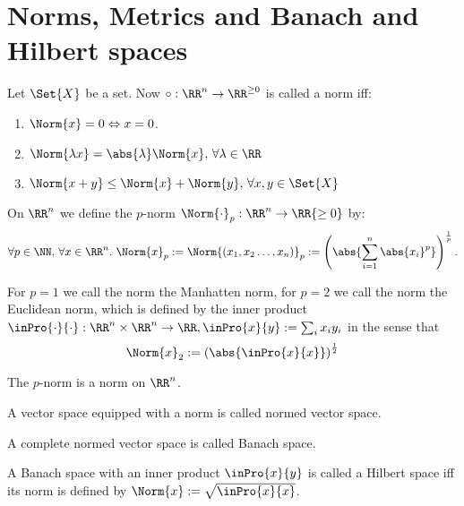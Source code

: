 \section{Norms, Metrics and Banach and Hilbert spaces}
\begin{defn}
 Let $\Set{X}$ be a set. Now $\circ:\RR^n\to\RR^{\geq 0}$ is called a norm iff:
 \begin{enumerate}
  \item $\Norm{x}=0\Leftrightarrow x=0$.
  \item $\Norm{\lambda x}=\abs{\lambda}\Norm{x}, \,\forall \lambda\in\RR$
  \item $\Norm{x+y}\leq\Norm{x}+\Norm{y}, \,\forall x,y\in\Set{X}$
 \end{enumerate}
\end{defn}
\begin{defn}
 On $\RR^n$ we define the $p$-norm $\Norm{\cdot}_p:\RR^n\to\RR{\geq 0}$ by:
 $$\forall p\in\NN,\, \forall x\in\RR^n.\ \Norm{x}_p:=\Norm{(x_1, x_2\ldots, x_n)}_p:=\left(\abs{\sum_{i=1}^{n}\abs{x_i}^p}\right)^{\frac{1}{p}}.$$
\end{defn}
For $p=1$ we call the norm the Manhatten norm, for $p=2$ we call the norm the Euclidean norm, which is defined by the inner product $\inPro{\cdot}{\cdot}:\RR^n\times \RR^n\to\RR, \inPro{x}{y}:=\sum_{i}x_iy_i$ in the sense that $$\Norm{x}_2:=\left(\abs{\inPro{x}{x}}\right)^\frac{1}{2}$$
\begin{exc}
 The $p$-norm is a norm on $\RR^n$. 
\end{exc}
\begin{defn}
 A vector space equipped with a norm is called normed vector space.
\end{defn}
\begin{defn}
 A complete normed vector space is called Banach space.
\end{defn}
\begin{defn}
 A Banach space with an inner product $\inPro{x}{y}$ is called a Hilbert space iff its norm is defined by $\Norm{x}:=\sqrt{\inPro{x}{x}}$.
\end{defn}

